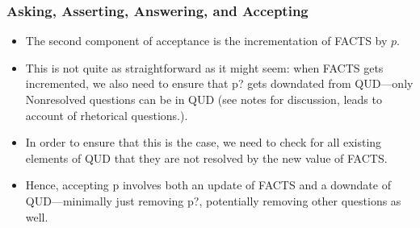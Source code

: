\documentclass{beamer}
\newcommand{\bit}{\begin{itemize}}
\newcommand{\eit}{\end{itemize}}
\begin{document}
{
}

\begin{frame}\frametitle{Asking, Asserting, Answering, and Accepting}

\bit


\item
The second component of acceptance is the incrementation of FACTS by
$p$.

\item  This is not quite as straightforward as it might seem: when
FACTS gets incremented, we also need to ensure that p? gets
downdated from QUD---only Nonresolved questions can be in QUD
(see notes for discussion, leads to account of rhetorical questions.). 

\item In order to ensure that this is the case, we need to
check for all existing elements of QUD that they are not resolved by
the new value of FACTS.

\item Hence, accepting p involves both an update of FACTS and a
downdate of QUD---minimally just removing p?, potentially removing
other questions as well.

\eit\end{frame}
\end{document}
